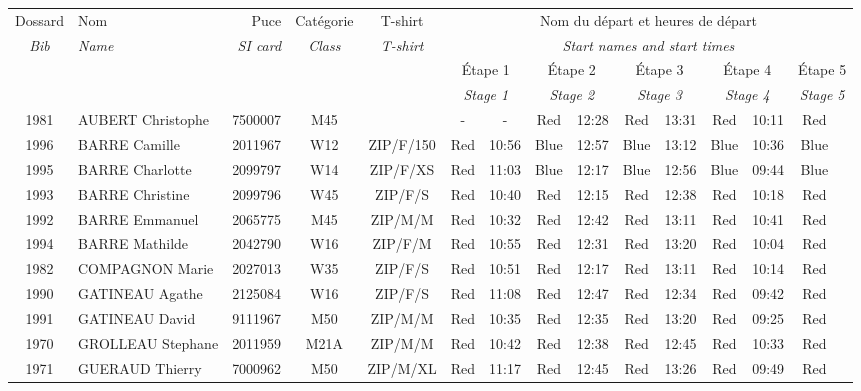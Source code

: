 \documentclass{report}
\begin{document}
  \begin{longtable}{|c|l|r|c|c|*{5}{cc|}}
    Dossard & Nom  & Puce    & Catégorie & T-shirt & \multicolumn{10}{c|}{Nom du départ et heures de départ} \\
    \itshape Bib     & \itshape Name & \itshape SI card & \itshape Class  & \itshape  T-shirt  & \multicolumn{10}{c|}{\itshape Start names and start times} \\
    \hline
    & & & & & \multicolumn{2}{c|}{Étape 1} & \multicolumn{2}{c|}{Étape 2} & \multicolumn{2}{c|}{Étape 3} & \multicolumn{2}{c|}{Étape 4} & \multicolumn{2}{c|}{Étape 5} \\
    & & & & & \multicolumn{2}{c|}{\itshape Stage 1} & \multicolumn{2}{c|}{\itshape Stage 2} & \multicolumn{2}{c|}{\itshape Stage 3} & \multicolumn{2}{c|}{\itshape Stage 4} & \multicolumn{2}{c|}{\itshape Stage 5} \\
    \hline
    1981 & AUBERT Christophe & 7500007 & M45 &   & - &  - & Red & 12:28 & Red & 13:31 & Red & 10:11 & Red &  \\
    1996 & BARRE Camille & 2011967 & W12 & ZIP/F/150 & Red & 10:56 & Blue & 12:57 & Blue & 13:12 & Blue & 10:36 & Blue &  \\
    1995 & BARRE Charlotte & 2099797 & W14 & ZIP/F/XS & Red & 11:03 & Blue & 12:17 & Blue & 12:56 & Blue & 09:44 & Blue &  \\
    1993 & BARRE Christine & 2099796 & W45 & ZIP/F/S & Red & 10:40 & Red & 12:15 & Red & 12:38 & Red & 10:18 & Red &  \\
    1992 & BARRE Emmanuel & 2065775 & M45 & ZIP/M/M & Red & 10:32 & Red & 12:42 & Red & 13:11 & Red & 10:41 & Red &  \\
    1994 & BARRE Mathilde & 2042790 & W16 & ZIP/F/M & Red & 10:55 & Red & 12:31 & Red & 13:20 & Red & 10:04 & Red &  \\
    1982 & COMPAGNON Marie & 2027013 & W35 & ZIP/F/S & Red & 10:51 & Red & 12:17 & Red & 13:11 & Red & 10:14 & Red &  \\
    1990 & GATINEAU Agathe & 2125084 & W16 & ZIP/F/S & Red & 11:08 & Red & 12:47 & Red & 12:34 & Red & 09:42 & Red &  \\
    1991 & GATINEAU David & 9111967 & M50 & ZIP/M/M & Red & 10:35 & Red & 12:35 & Red & 13:20 & Red & 09:25 & Red &  \\
    1970 & GROLLEAU Stephane & 2011959 & M21A & ZIP/M/M & Red & 10:42 & Red & 12:38 & Red & 12:45 & Red & 10:33 & Red &  \\
    1971 & GUERAUD Thierry & 7000962 & M50 & ZIP/M/XL & Red & 11:17 & Red & 12:45 & Red & 13:26 & Red & 09:49 & Red &  \\

\end{longtable}
\end{document}
